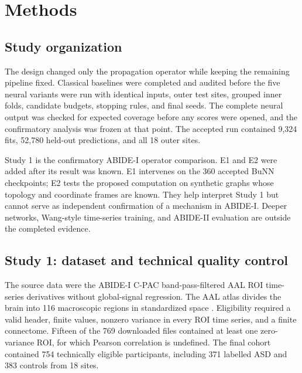 \documentclass[11pt,a4paper]{article}
\begin{document}
\section{Methods}

\subsection{Study organization}

The design changed only the propagation operator while keeping the remaining
pipeline fixed. Classical baselines were completed and audited before the five
neural variants were run with identical inputs, outer test sites, grouped
inner folds, candidate budgets, stopping rules, and final seeds. The complete
neural output was checked for expected coverage before any scores were opened,
and the confirmatory analysis was frozen at that point. The accepted run
contained 9,324 fits, 52,780 held-out predictions, and all 18 outer sites.

Study 1 is the confirmatory ABIDE-I operator comparison. E1 and E2 were added
after its result was known. E1 intervenes on the 360 accepted BuNN checkpoints;
E2 tests the proposed computation on synthetic graphs whose topology and
coordinate frames are known. They help interpret Study 1 but cannot serve as
independent confirmation of a mechanism in ABIDE-I. Deeper networks,
Wang-style time-series training, and ABIDE-II evaluation are outside the
completed evidence.

\subsection{Study 1: dataset and technical quality control}

The source data were the ABIDE-I C-PAC band-pass-filtered AAL ROI time-series
derivatives without global-signal regression. The AAL atlas divides the brain
into 116 macroscopic regions in standardized space \cite{tzourio2002aal}.
Eligibility required a valid header, finite values, nonzero variance in every
ROI time series, and a finite connectome. Fifteen of the 769 downloaded files
contained at least one zero-variance ROI, for which Pearson correlation is
undefined. The final cohort contained 754 technically eligible participants,
including 371 labelled ASD and 383 controls from 18 sites.
\end{document}
